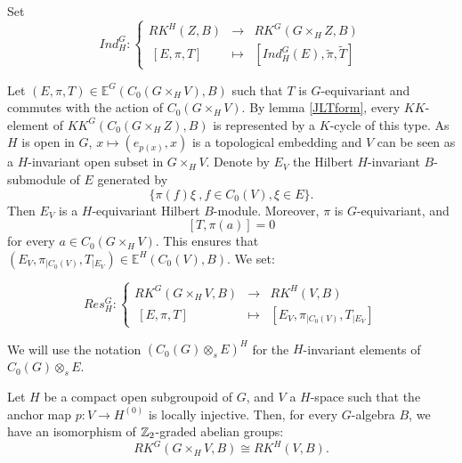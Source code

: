 Set
\[Ind_H^G :
\left\{\begin{array}{rcl} 
RK^H(Z,B) & \rightarrow & RK^G(G\times_H Z,B) \\
\ [E,\pi,T ] & \mapsto & [ Ind_H^G (E), \tilde \pi, \tilde T ] \end{array} \right.\]

Let $(E,\pi,T)\in \mathbb E^G(C_0(G\times_H V),B)$ such that $T$ is $G$-equivariant and commutes with the action of $C_0(G\times_H V)$. By lemma \ref{JLTform}, every $KK$-element of $KK^G(C_0(G\times_H Z),B)$ is represented by a $K$-cycle of this type.  As $H$ is open in $G$, $x\mapsto (e_{p(x)},x)$ is a topological embedding and $V$ can be seen as a $H$-invariant open subset in $G\times_H V$. Denote by $E_V$ the Hilbert $H$-invariant $B$-submodule of $E$ generated by 
\[\{\pi(f)\xi \ ,f\in C_0(V), \xi\in E\}.\]
Then $E_{V}$ is a $H$-equivariant Hilbert $B$-module. Moreover, $\pi$ is $G$-equivariant, and \[[T,\pi(a)]=0\] for every $a\in C_0(G\times_H V)$. This ensures that $(E_V,\pi_{|C_0(V)}, T_{|E_V}) \in \mathbb E^H(C_0(V),B)$. We set:

\[Res_H^G :
\left\{\begin{array}{rcl} 
 RK^G(G\times_H V,B) & \rightarrow & RK^H(V,B) \\
\ [E,\pi,T ] & \mapsto & [ E_V,\pi_{|C_0(V)}, T_{|E_V} ] \end{array} \right.\]

We will use the notation $\left( C_0(G)\otimes_s E \right)^H$ for the $H$-invariant elements of $C_0(G)\otimes_s E$.

\begin{lem} \label{Restriction} Let $H$ be a compact open subgroupoid of $G$, and $V$ a $H$-space such that the anchor map $p : V\rightarrow H^{(0)}$ is locally injective. Then, for every $G$-algebra $B$, we have an isomorphism of $\mathbb Z_2$-graded abelian groups:
\[RK^G( G\times_H V, B) \cong RK^H(V, B).\]
\end{lem}

